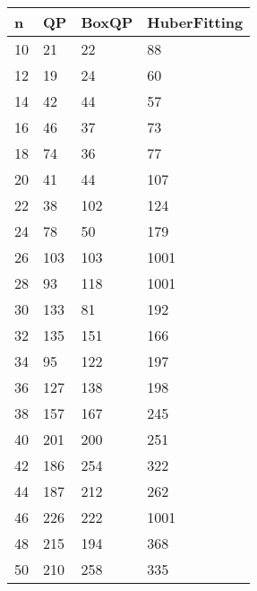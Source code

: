 \begin{tabular}{llll}
n & QP & BoxQP & HuberFitting \\ 
\hline 
10 & 21 & 22 & 88 \\ 
12 & 19 & 24 & 60 \\ 
14 & 42 & 44 & 57 \\ 
16 & 46 & 37 & 73 \\ 
18 & 74 & 36 & 77 \\ 
20 & 41 & 44 & 107 \\ 
22 & 38 & 102 & 124 \\ 
24 & 78 & 50 & 179 \\ 
26 & 103 & 103 & 1001 \\ 
28 & 93 & 118 & 1001 \\ 
30 & 133 & 81 & 192 \\ 
32 & 135 & 151 & 166 \\ 
34 & 95 & 122 & 197 \\ 
36 & 127 & 138 & 198 \\ 
38 & 157 & 167 & 245 \\ 
40 & 201 & 200 & 251 \\ 
42 & 186 & 254 & 322 \\ 
44 & 187 & 212 & 262 \\ 
46 & 226 & 222 & 1001 \\ 
48 & 215 & 194 & 368 \\ 
50 & 210 & 258 & 335 \\ 
\hline 
\end{tabular}
